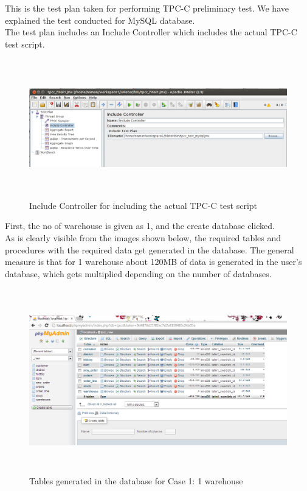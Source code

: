 \documentclass[12pt]{book}
\begin{document}
  This is the test plan taken for performing TPC-C preliminary test. We have explained the test conducted for MySQL database.\\
  The test plan includes an Include Controller which includes the actual TPC-C test script.
  
  \begin{figure}[H]
    \centering
    \includegraphics[width=15cm, height=6cm]{images/ntpcc_82}
    \caption{Include Controller for including the actual TPC-C test script\label{fig:fig66_JMeter}}
  \end{figure} 
   
   First, the no of warehouse is given as 1, and the create database clicked.\\
  As is clearly visible from the images shown below, the required tables and procedures with the required data get generated in the database. The general measure
  is that for 1 warehouse about 120MB of data is generated in the user’s database, which gets multiplied depending on the number of databases. \\

  \begin{figure}[H]
    \centering
    \includegraphics[width=15cm, height=8cm]{images/ntpcc_83}
    \caption{Tables generated in the database for Case 1: 1 warehouse\label{fig:fig67_JMeter}}
  \end{figure} 
  
\end{document}
